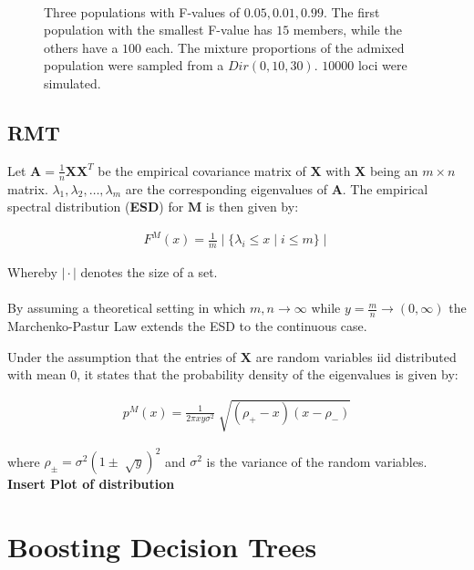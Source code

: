 \documentclass[a4paper, 11pt]{article}
\begin{document}
\begin{figure}[h!]
\\Three populations with F-values  of $0.05, 0.01, 0.99$. The first population with the smallest F-value has $15$ members, while the others have a $100$ each. The mixture proportions of the admixed population were sampled from a $Dir(0, 10, 30)$. $10000$ loci were simulated.

\centering
\end{figure}


\newpage

\subsection{RMT}

Let $\mathbf{A} = \frac{1}{n}\mathbf{X}\mathbf{X}^{T}$ be the empirical covariance matrix of $\mathbf{X}$ with $\mathbf{X}$ being an $m \times n$ matrix. $\lambda_{1},\lambda_{2}, \dots, \lambda_{m}$ are the corresponding eigenvalues of $\mathbf{A}$. The empirical spectral distribution (\textbf{ESD}) for  $\mathbf{M}$ is then given by:

\begin{align*}
F^{M}(x) = \frac{1}{m} \mid \{\lambda_{i} \leq x \mid i \leq m\} \mid
\end{align*}

Whereby $\mid \cdot \mid$ denotes the size of a set.
\\
\\
By assuming a theoretical setting in which $m, n \rightarrow \infty$ while $y = \frac{m}{n} \rightarrow (0, \infty)$ the Marchenko-Pastur Law extends the ESD to the continuous case.

Under the assumption that the entries of $\mathbf{X}$ are random variables iid distributed with mean $0$, it states that the probability density of the eigenvalues is given by:

\begin{align*}
p^{M}(x) = \frac{1}{2\pi xy \sigma^{2}}  \sqrt[]{(\rho_{+} - x)(x - \rho_{-})}
\end{align*}

where $\rho_{\pm} = \sigma^{2}(1 \pm \sqrt[]{y})^{2}$ and $\sigma^2$ is the variance of the random variables.
\\
\textbf{Insert Plot of distribution}
\\

\newpage

\section{Boosting Decision Trees}
\end{document}

